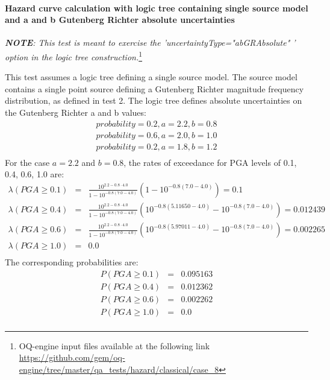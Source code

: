 \paragraph{Hazard curve calculation with logic tree containing single
source model and a and b Gutenberg Richter absolute uncertainties}
\textit{\textbf{NOTE}: This test is meant to exercise the
'uncertaintyType="abGRAbsolute" ' option in the logic tree construction.}\footnote{
    OQ-engine input files available at the following link
    \url{https://github.com/gem/oq-engine/tree/master/qa_tests/hazard/classical/case_8}} 

This test assumes a logic tree defining a single source model. The source model
contains a single point source defining a Gutenberg Richter magnitude frequency
distribution, as defined in test 2. The logic tree defines absolute
uncertainties on the Gutenberg Richter a and b values:
\begin{eqnarray}
probability = 0.2, a = 2.2, b = 0.8 \nonumber \\
probability = 0.6, a = 2.0, b = 1.0 \nonumber \\
probability = 0.2, a = 1.8, b = 1.2 \nonumber \\
\end{eqnarray}
For the case $a=2.2$ and $b=0.8$, the rates of exceedance for PGA levels of 0.1, 0.4, 0.6, 1.0 are:
\begin{eqnarray}
\lambda(PGA \geq 0.1) &=& \frac{10^{2.2 - 0.8\cdot4.0}}{1 - 10^{-0.8(7.0 - 4.0)}}(1 - 10^{-0.8(7.0 - 4.0)}) = 0.1 \nonumber \\
\lambda(PGA \geq 0.4) &=& \frac{10^{2.2 - 0.8\cdot4.0}}{1 - 10^{-0.8(7.0 - 4.0)}}(10^{-0.8(5.11650-4.0)} - 10^{-0.8(7.0 - 4.0)}) = 0.012439 \nonumber \\
\lambda(PGA \geq 0.6) &=& \frac{10^{2.2 - 0.8\cdot4.0}}{1 - 10^{-0.8(7.0 - 4.0)}}(10^{-0.8(5.97011-4.0)} - 10^{-0.8(7.0 - 4.0)}) = 0.002265 \nonumber \\
\lambda(PGA \geq 1.0) &=& 0.0 \nonumber \\
\end{eqnarray}
The corresponding probabilities are:
\begin{eqnarray}
P(PGA \geq 0.1) &=& 0.095163\nonumber \\
P(PGA \geq 0.4) &=& 0.012362\nonumber \\
P(PGA \geq 0.6) &=& 0.002262\nonumber \\
P(PGA \geq 1.0) &=& 0.0\nonumber \\
\end{eqnarray}
